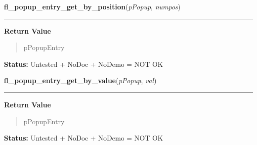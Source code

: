     \label{xformslib:library:fl_popup_entry_get_by_position}

    \vspace{0.5ex}

\hspace{.8\funcindent}\begin{boxedminipage}{\funcwidth}

    \raggedright \textbf{fl\_popup\_entry\_get\_by\_position}(\textit{pPopup}, \textit{numpos})

    \vspace{-1.5ex}

    \rule{\textwidth}{0.5\fboxrule}
\setlength{\parskip}{2ex}
\setlength{\parskip}{1ex}
      \textbf{Return Value}
    \vspace{-1ex}

      \begin{quote}
      pPopupEntry

      \end{quote}

\textbf{Status:} Untested + NoDoc + NoDemo = NOT OK



    \end{boxedminipage}

    \label{xformslib:library:fl_popup_entry_get_by_value}

    \vspace{0.5ex}

\hspace{.8\funcindent}\begin{boxedminipage}{\funcwidth}

    \raggedright \textbf{fl\_popup\_entry\_get\_by\_value}(\textit{pPopup}, \textit{val})

    \vspace{-1.5ex}

    \rule{\textwidth}{0.5\fboxrule}
\setlength{\parskip}{2ex}
\setlength{\parskip}{1ex}
      \textbf{Return Value}
    \vspace{-1ex}

      \begin{quote}
      pPopupEntry

      \end{quote}

\textbf{Status:} Untested + NoDoc + NoDemo = NOT OK



    \end{boxedminipage}

